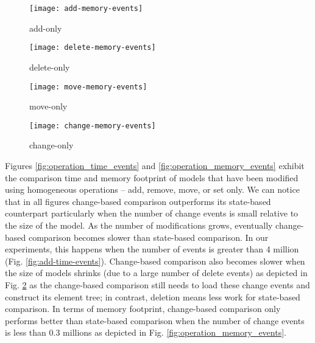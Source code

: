 \begin{figure*}[ht]
    \centering
    \begin{subfigure}[t]{0.245\linewidth}
        \texttt{[image: add-memory-events]}
        \caption{add-only}
        \label{fig:add-memory-events}
    \end{subfigure}
    \hfill
    \begin{subfigure}[t]{0.245\linewidth}
        \texttt{[image: delete-memory-events]}
        \caption{delete-only}
        \label{fig:delete-memory-events}
    \end{subfigure}
    \hfill
    \begin{subfigure}[t]{0.245\linewidth}
        \texttt{[image: move-memory-events]}
        \caption{move-only}
        \label{fig:move-memory-events}
    \end{subfigure}
    \hfill
    \begin{subfigure}[t]{0.245\linewidth}
        \texttt{[image: change-memory-events]}
        \caption{change-only}
        \label{fig:change-memory-events}
    \end{subfigure}
    \caption{Memory footprint for homogeneous operations.}
    \label{fig:operation_memory_events}
\end{figure*}

Figures \ref{fig:operation_time_events} and \ref{fig:operation_memory_events} exhibit the comparison time and memory footprint of models that have been modified using homogeneous operations -- \textsf{add}, \textsf{remove}, \textsf{move}, or \textsf{set} only. We can notice that in all figures change-based comparison outperforms its state-based counterpart particularly when the number of change events is small relative to the size of the model. As the number of modifications grows, eventually change-based comparison becomes slower than state-based comparison. In our experiments, this happens when the number of events is greater than 4 million (Fig. \ref{fig:add-time-events}). Change-based comparison also becomes slower when the size of models shrinks (due to a large number of delete events) as depicted in Fig. \ref{fig:delete-memory-events} as the change-based comparison still needs to load these change events and construct its element tree; in contrast, deletion means less work for state-based comparison. In terms of memory footprint, change-based comparison only performs better than state-based comparison when the number of change events is less than 0.3 millions as depicted in Fig. \ref{fig:operation_memory_events}.

